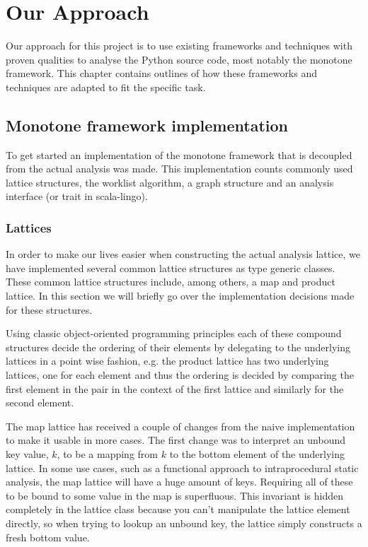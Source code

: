 \chapter{Our Approach}

Our approach for this project is to use existing frameworks and techniques with proven qualities to analyse the Python source code, most notably the monotone framework. This chapter contains outlines of how these frameworks and techniques are adapted to fit the specific task.

\section{Monotone framework implementation}

To get started an implementation of the monotone framework that is decoupled from the actual analysis was made. This implementation counts commonly used lattice structures, the worklist algorithm, a graph structure and an analysis interface (or trait in scala-lingo).

\subsection{Lattices}
In order to make our lives easier when constructing the actual analysis lattice, we have implemented several common lattice structures as type generic classes. These common lattice structures include, among others, a map and product lattice. In this section we will briefly go over the implementation decisions made for these structures.

Using classic object-oriented programming principles each of these compound structures decide the ordering of their elements by delegating to the underlying lattices in a point wise fashion, e.g. the product lattice has two underlying lattices, one for each element and thus the ordering is decided by comparing the first element in the pair in the context of the first lattice and similarly for the second element.

The map lattice has received a couple of changes from the naive implementation to make it usable in more cases. The first change was to interpret an unbound key value, $k$, to be a mapping from $k$ to the bottom element of the underlying lattice. In some use cases, such as a functional approach to intraprocedural static analysis, the map lattice will have a huge amount of keys. Requiring all of these to be bound to some value in the map is superfluous. This invariant is hidden completely in the lattice class because you can't manipulate the lattice element directly, so when trying to lookup an unbound key, the lattice simply constructs a fresh bottom value.

